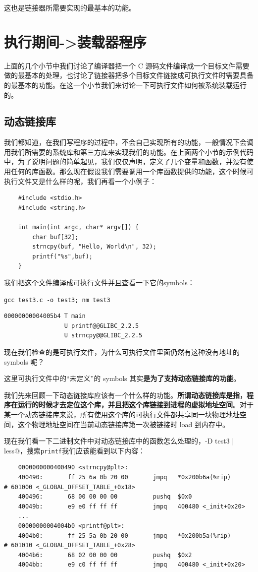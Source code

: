 \documentclass[UTF8,a4paper,12pt]{ctexbook}
\begin{document}
				这也是链接器所需要实现的最基本的功能。
				
	\section{执行期间->装载器程序}
		上面的几个小节中我们讨论了编译器把一个 C 源码文件编译成一个目标文件需要做的最基本的处理，也讨论了链接器把多个目标文件链接成可执行文件时需要具备的最基本的功能。在这一个小节我们来讨论一下可执行文件如何被系统装载运行的。
		
		\subsection{动态链接库}
			我们都知道，在我们写程序的过程中，不会自己实现所有的功能，一般情况下会调用我们所需要的系统库和第三方库来实现我们的功能。在上面两个小节的示例代码中，为了说明问题的简单起见，我们仅仅声明，定义了几个变量和函数，并没有使用任何的库函数。那么现在假设我们需要调用一个库函数提供的功能，这个时候可执行文件又是什么样的呢，我们再看一个小例子：
			
			\begin{lstlisting}
	#include <stdio.h>
	#include <string.h>
	
	int main(int argc, char* argv[]) {
		char buf[32];
		strncpy(buf, "Hello, World\n", 32);
		printf("%s",buf);
	}
			\end{lstlisting}
		
			我们把这个文件编译成可执行文件并且查看一下它的symbols：
			
			\verb|gcc test3.c -o test3; nm test3|
			\begin{lstlisting}
00000000004005b4 T main
				 U printf@@GLIBC_2.2.5
				 U strncpy@@GLIBC_2.2.5		
			\end{lstlisting}
			
			现在我们检查的是可执行文件，为什么可执行文件里面仍然有这种没有地址的 symbols 呢？
			
			这里可执行文件中的“未定义”的 symbols 其实\textbf{是为了支持动态链接库的功能}。
			
			我们先来回顾一下动态链接库应该有一个什么样的功能。\textbf{所谓动态链接库是指，程序在运行的时候才去定位这个库，并且把这个库链接到进程的虚拟地址空间}。对于某一个动态链接库来说，所有使用这个库的可执行文件都共享同一块物理地址空间，这个物理地址空间在当前动态链接库第一次被链接时 load 到内存中。
			
			现在我们看一下二进制文件中对动态链接库中的函数怎么处理的，\verb@objdump -D test3 | less@，搜索\verb|printf|我们应该能看到以下内容：
			\begin{lstlisting}
	0000000000400490 <strncpy@plt>:
	400490:       ff 25 6a 0b 20 00       jmpq   *0x200b6a(%rip)        # 601000 <_GLOBAL_OFFSET_TABLE_+0x18>
	400496:       68 00 00 00 00          pushq  $0x0
	40049b:       e9 e0 ff ff ff          jmpq   400480 <_init+0x20>
	...
	00000000004004b0 <printf@plt>:
	4004b0:       ff 25 5a 0b 20 00       jmpq   *0x200b5a(%rip)        # 601010 <_GLOBAL_OFFSET_TABLE_+0x28>
	4004b6:       68 02 00 00 00          pushq  $0x2
	4004bb:       e9 c0 ff ff ff          jmpq   400480 <_init+0x20>
			\end{lstlisting}
			
\end{document}
